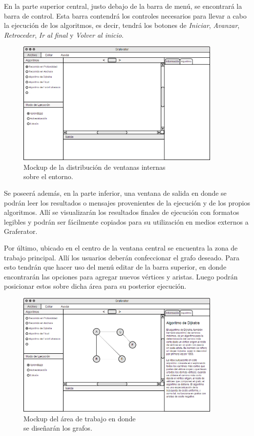 \documentclass{book}
\begin{document}
En la parte superior central, justo debajo de la barra de menú, se encontrará la barra de control. Esta barra contendrá los controles necesarios para llevar a cabo la ejecución de los algoritmos, es decir, tendrá los botones de \textit{Iniciar}, \textit{Avanzar}, \textit{Retroceder}, \textit{Ir al final} y \textit{Volver al inicio}.
\bigskip

\begin{figure}[H]
	\centering
	\includegraphics[width=0.9\textwidth]{images/02-02.png}
	\medskip
	\caption{Mockup de la distribución de ventanas internas \\ sobre el entorno.}
	\medskip
\end{figure}
\bigskip

Se poseerá además, en la parte inferior, una ventana de salida en donde se podrán leer los resultados o mensajes provenientes de la ejecución y de los propios algoritmos. Allí se visualizarán los resultados finales de ejecución con formatos legibles y podrán ser fácilmente copiados para su utilización en medios externos a Graferator.
\par
Por último, ubicado en el centro de la ventana central se encuentra la zona de trabajo principal. Allí los usuarios deberán confeccionar el grafo deseado. Para esto tendrán que hacer uso del menú editar de la barra superior, en donde encontrarán las opciones para agregar nuevos vértices y aristas. Luego podrán posicionar estos sobre dicha área para su posterior ejecución.
\newpage

\begin{figure}[H]
	\centering
	\includegraphics[width=0.9\textwidth]{images/02-03.png}
	\medskip
	\caption{Mockup del área de trabajo en donde \\ se diseñarán los grafos.}
	\medskip
\end{figure}
\bigskip
\end{document}
